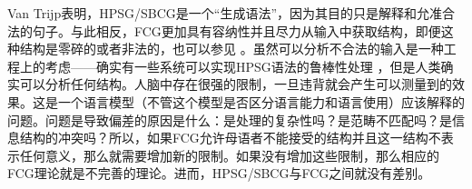 Van Trijp表明，HPSG/SBCG是一个“生成语法”，因为其目的只是解释和允准合法的句子。与此相反，FCG更加具有容纳性并且尽力从输入中获取结构，即便这种结构是零碎的或者非法的，也可以参见 \citet[]{Steels2013a}。虽然可以分析不合法的输入是一种工程上的考虑——确实有一些系统可以实现HPSG语法的鲁棒性处理 \citep*{KKN2000a-u,Copestake2007a-u}，但是人类确实可以分析任何结构。人脑中存在很强的限制，一旦违背就会产生可以测量到的效果。这是一个语言模型（不管这个模型是否区分语言能力和语言使用）应该解释的问题。问题是导致偏差的原因是什么：是处理的复杂性吗？是范畴不匹配吗？是信息结构的冲突吗？所以，如果FCG允许母语者不能接受的结构并且这一结构不表示任何意义，那么就需要增加新的限制。如果没有增加这些限制，那么相应的FCG理论就是不完善的理论。进而，HPSG/SBCG与FCG之间就没有差别。


